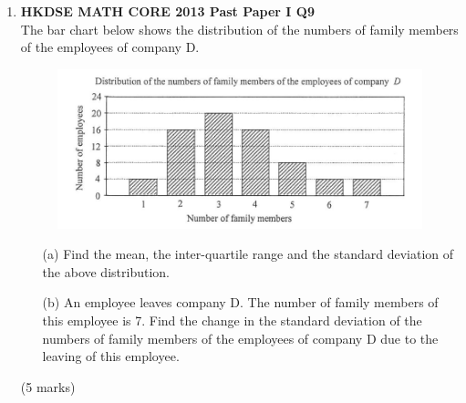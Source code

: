 \documentclass[12pt]{article}
\begin{document}
\begin{enumerate}
	\item \textbf{HKDSE MATH CORE 2013 Past Paper I Q9}\\
	The bar chart below shows the distribution of the numbers of family members of the employees of company D.
	\begin{figure}[H]
		\centering
		\includegraphics[width = .3\linewidth]{2013Figure1.00}
	\end{figure} 
	\begin{enumerate}
		\item[(a)] Find the mean, the inter-quartile range and the standard deviation of the above distribution.
		\item[(b)] An employee leaves company D. The number of family members of this employee is 7. Find the change in the standard deviation of the numbers of family members of the employees of company D due to the leaving of this employee.
	\end{enumerate}
	(5 marks)


\end{enumerate}
\end{document}
